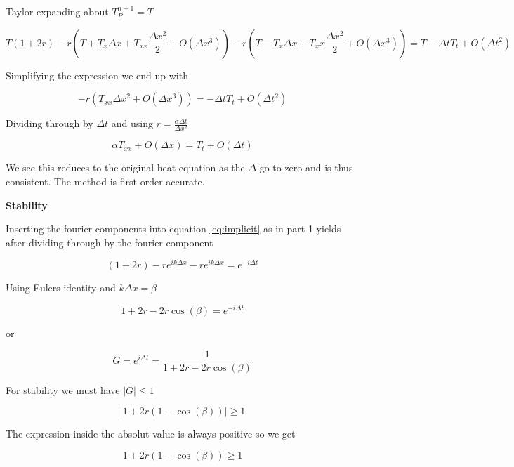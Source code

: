 \documentclass{article}
\begin{document}
Taylor expanding about $T_P^{n+1} = T$

\begin{equation}
T(1+2r) - r(T + T_x \Delta x + T_{xx} \frac{\Delta x^2}{2} + O(\Delta x^3)) - r(T - T_x \Delta x + T_xx \frac{\Delta x^2}{2}+ O(\Delta x^3)) = T - \Delta t T_t + O(\Delta t^2)
\end{equation}

Simplifying the expression we end up with

\begin{equation}
 	-r (T_{xx}\Delta x^2 +  O(\Delta x^3) ) = -\Delta t T_t  + O(\Delta t^2)
\end{equation}

Dividing through by $\Delta t$ and using $r = \frac{\alpha \Delta t}{\Delta x^2}$

\begin{equation}
 	\alpha T_{xx} +  O(\Delta x)  = T_t  + O(\Delta t)
\end{equation}

We see this reduces to the original heat equation as the $\Delta$ go to zero and is thus consistent. The method is first order accurate.

\textbf{Stability}

Inserting the fourier components into equation \ref{eq:implicit} as in part 1 yields after dividing through by the fourier component

\begin{equation}
(1+2r) - re^{ik\Delta x} - re^{ik\Delta x} = e^{-i\Delta t}
\end{equation}

Using Eulers identity and $k\Delta x = \beta$

\begin{equation}
 	1+2r - 2r\cos(\beta) =  e^{-i\Delta t}
\end{equation}

or

\begin{equation}
 	G = e^{i\Delta t} = \frac{1}{1+2r - 2r\cos(\beta) }
\end{equation}

For stability we must have $|G| \leq 1$

\begin{equation}
 	|1 + 2r(1-\cos(\beta) )| \geq 1
\end{equation}

The expression inside the absolut value is always positive so we get


\begin{equation}
 	1 + 2r(1-\cos(\beta) ) \geq 1
\end{equation}
\end{document}
